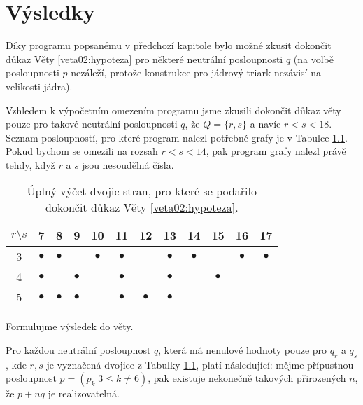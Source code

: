 \chapter{Výsledky} \label{vysledky}

Díky programu popsanému v předchozí kapitole bylo možné zkusit dokončit důkaz Věty \ref{veta02:hypoteza} pro některé neutrální posloupnosti $q$ (na volbě posloupnosti $p$ nezáleží, protože konstrukce pro jádrový triark nezávisí na velikosti jádra). 

Vzhledem k výpočetním omezením programu jsme zkusili dokončit důkaz věty pouze pro takové neutrální posloupnosti $q$, že $Q = \lbrace r, s\rbrace$ a navíc $r<s<18$. Seznam posloupností, pro které program nalezl potřebné grafy je v Tabulce \ref{obr03:tabvysledky}. Pokud bychom se omezili na rozsah $r<s<14$, pak program grafy nalezl právě tehdy, když $r$ a $s$ jsou nesoudělná čísla.

\begin{table}[h]\centering
\begin{tabular}{ c | c c c c c c c c c c c }
  {$r\setminus s$} & 7 & 8 & 9 & 10 & 11 & 12 & 13 & 14 & 15 & 16 & 17 \\ \hline
  3 & $\bullet$ & $\bullet$ &  & $\bullet$ & $\bullet$ &  & $\bullet$ & $\bullet$ &  & $\bullet$ & $\bullet$ \\
  4 & $\bullet$ &  & $\bullet$ &  & $\bullet$ &  & $\bullet$ &  & $\bullet$ \\
  5 & $\bullet$ & $\bullet$ & $\bullet$ &  & $\bullet$ & $\bullet$ & $\bullet$  
\end{tabular}
\caption{Úplný výčet dvojic stran, pro které se podařilo dokončit důkaz Věty \ref{veta02:hypoteza}.}
\label{obr03:tabvysledky}
\end{table}

Formulujme výsledek do věty.

\begin{veta} \label{veta:vysledek}
Pro každou neutrální posloupnost $q$, která má nenulové hodnoty pouze pro $q_r$ a $q_s$, kde $r,s$ je vyznačená dvojice z Tabulky \ref{obr03:tabvysledky}, platí následující: 
mějme přípustnou posloupnost $p=(p_k | 3 \leq k \neq 6)$, pak existuje nekonečně takových přirozených $n$, že $p+nq$ je realizovatelná.
\end{veta}


